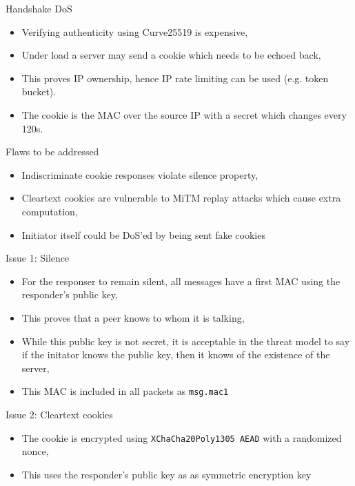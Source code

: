 \documentclass[xcolor=table]{beamer}
\begin{document}
    \begin{frame}{Handshake DoS}
    \begin{itemize}
        \item Verifying authenticity using Curve25519 is expensive,
        \item Under load a server may send a cookie which needs to be echoed back,
        \item This proves IP ownership, hence IP rate limiting can be used (e.g. token bucket).
        \item The cookie is the MAC over the source IP with a secret which changes every 120s.
    \end{itemize}
    \end{frame}

    \begin{frame}{Flaws to be addressed}
        \begin{itemize}
            \item Indiscriminate cookie responses violate silence property,
            \item Cleartext cookies are vulnerable to MiTM replay attacks which cause extra computation,
            \item Initiator itself could be DoS'ed by being sent fake cookies
        \end{itemize}
    \end{frame}

    \begin{frame}{Issue 1: Silence}
        \begin{itemize}
            \item For the responser to remain silent, all messages have a first MAC using the responder's public key,
            \item This proves that a peer knows to whom it is talking,
            \item While this public key is not secret, it is acceptable in the threat model to say if the initator knows the public key, then it knows of the existence of the server,
            \item This MAC is included in all packets as \texttt{msg.mac1}
        \end{itemize}
    \end{frame}

    \begin{frame}{Issue 2: Cleartext cookies}
    \begin{itemize}
        \item The cookie is encrypted using \texttt{XChaCha20Poly1305 AEAD} with a randomized nonce,
        \item This uses the responder's public key as as symmetric encryption key
    \end{itemize}
    \end{frame}
\end{document}
